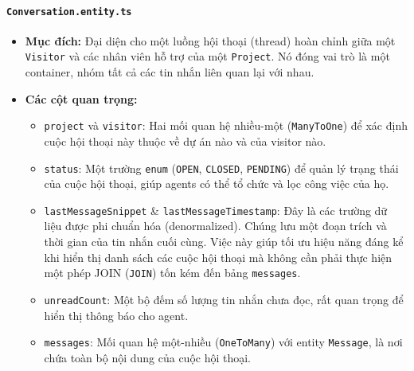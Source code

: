 \paragraph{\texttt{Conversation.entity.ts}}
\begin{itemize}
    \item \textbf{Mục đích:} Đại diện cho một luồng hội thoại (thread) hoàn chỉnh giữa một \texttt{Visitor} và các nhân viên hỗ trợ của một \texttt{Project}. Nó đóng vai trò là một container, nhóm tất cả các tin nhắn liên quan lại với nhau.
    \item \textbf{Các cột quan trọng:}    
    \begin{itemize}
        \item \texttt{project} và \texttt{visitor}: Hai mối quan hệ nhiều-một (\texttt{ManyToOne}) để xác định cuộc hội thoại này thuộc về dự án nào và của visitor nào.
        \item \texttt{status}: Một trường \texttt{enum} (\texttt{OPEN}, \texttt{CLOSED}, \texttt{PENDING}) để quản lý trạng thái của cuộc hội thoại, giúp agents có thể tổ chức và lọc công việc của họ.
        \item \texttt{lastMessageSnippet} \& \texttt{lastMessageTimestamp}: Đây là các trường dữ liệu được phi chuẩn hóa (denormalized). Chúng lưu một đoạn trích và thời gian của tin nhắn cuối cùng. Việc này giúp tối ưu hiệu năng đáng kể khi hiển thị danh sách các cuộc hội thoại mà không cần phải thực hiện một phép JOIN (\texttt{JOIN}) tốn kém đến bảng \texttt{messages}.
        \item \texttt{unreadCount}: Một bộ đếm số lượng tin nhắn chưa đọc, rất quan trọng để hiển thị thông báo cho agent.
        \item \texttt{messages}: Mối quan hệ một-nhiều (\texttt{OneToMany}) với entity \texttt{Message}, là nơi chứa toàn bộ nội dung của cuộc hội thoại.
    \end{itemize}
\end{itemize}

